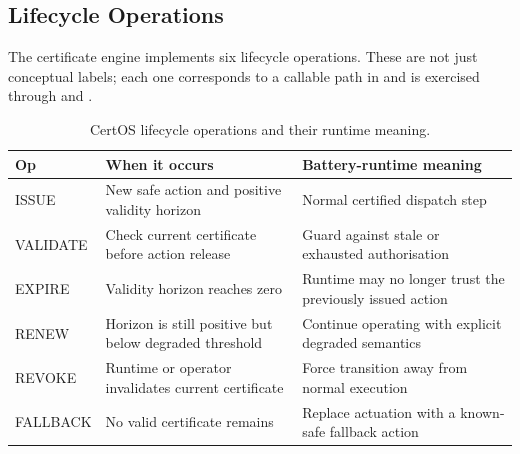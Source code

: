 \subsection{Lifecycle Operations}

The certificate engine implements six lifecycle operations.  These are not
just conceptual labels; each one corresponds to a callable path in
 and is exercised through
 and .

\begin{table}[ht]
\centering
\caption{CertOS lifecycle operations and their runtime meaning.}
\label{tab:certos-lifecycle-ops}
\begin{tabular}{p{1.7cm}p{4.2cm}p{5.0cm}}
\toprule
\textbf{Op} & \textbf{When it occurs} & \textbf{Battery-runtime meaning} \\
\midrule
ISSUE & New safe action and positive validity horizon & Normal certified dispatch step \\
VALIDATE & Check current certificate before action release & Guard against stale or exhausted authorisation \\
EXPIRE & Validity horizon reaches zero & Runtime may no longer trust the previously issued action \\
RENEW & Horizon is still positive but below degraded threshold & Continue operating with explicit degraded semantics \\
REVOKE & Runtime or operator invalidates current certificate & Force transition away from normal execution \\
FALLBACK & No valid certificate remains & Replace actuation with a known-safe fallback action \\
\bottomrule
\end{tabular}
\end{table}

